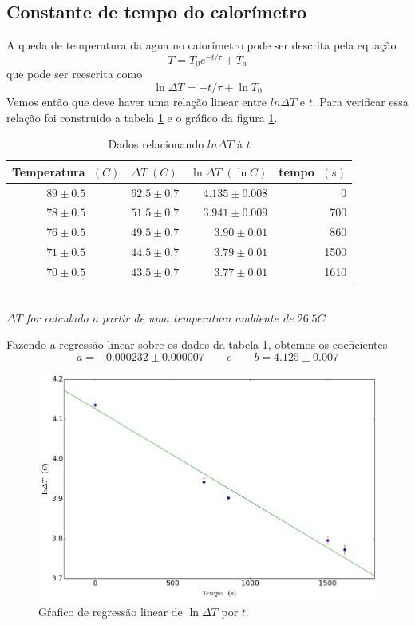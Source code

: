 \documentclass[12pt,a4paper]{article}
\begin{document}
\subsection{Constante de tempo do calorímetro}
A queda de temperatura da agua no calorímetro pode ser descrita pela equação
$$ T = T_0 e^{-t/\tau} + T_a $$
que pode ser reescrita como
$$ \ln \Delta T = -t/\tau + \ln T_0 $$
Vemos então que deve haver uma relação linear entre $ln \Delta T$ e $ t $. Para verificar essa relação foi construido a tabela \ref{table:tempo} e o gráfico da figura \ref{fig:tempo}. \\
\begin{table}[!htbp]
\centering
\def\arraystretch{1.5}
\caption{Dados relacionando $ln \Delta T$ à $t$}
\label{table:tempo}
\begin{tabular}{|c|l|r|r|}
\hline
Temperatura $\; (C)$ & $\Delta T \; (C)$ & $\ln \Delta T \; (\ln C)$ & tempo $\; (s)$ \\
\hline
 $89 \pm 0.5$ & $ 62.5 \pm  0.7 $ & $ 4.135 \pm 0.008 $    &    0 \\
 \hline
 $78 \pm 0.5$ & $ 51.5 \pm  0.7 $ & $ 3.941 \pm 0.009 $ &  700 \\
 \hline
 $76 \pm 0.5 $& $ 49.5 \pm  0.7 $ & $ 3.90 \pm 0.01 $ &  860 \\
 \hline
 $71 \pm 0.5$ & $ 44.5 \pm  0.7 $ & $ 3.79 \pm 0.01 $ & 1500 \\
 \hline
 $70 \pm 0.5$& $ 43.5 \pm  0.7 $ & $ 3.77 \pm 0.01 $ & 1610 \\
\hline
\end{tabular}\\
\emph{$\Delta T$ for calculado a partir de uma temperatura ambiente de $26.5 C$}

\end{table}
Fazendo a regressão linear sobre os dados da tabela \ref{table:tempo}, obtemos os coeficientes 
$$ a = -0.000232 \pm 0.000007\qquad e\qquad b = 4.125 \pm 0.007 $$

\begin{figure}[!htbp]
\includegraphics[scale=0.55]{tempo.png}
\caption{Gŕafico de regressão linear de $ \ln \Delta T$ por $t$.}
\label{fig:tempo}
\end{figure}
\end{document}
